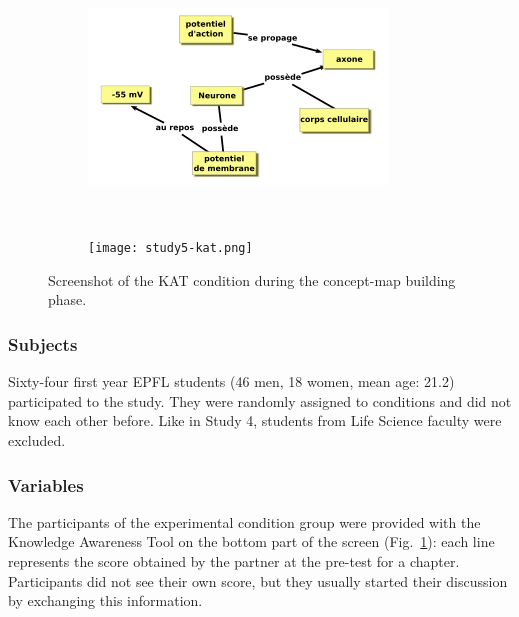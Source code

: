\documentclass[natbib]{svjour3}
\begin{document}
\begin{figure}[h!t]
        \centering
        \begin{subfigure}{.6\textwidth}
            \includegraphics[width=\linewidth]{study5-conceptmap.png}
        \end{subfigure} \\
        \begin{subfigure}{.7\textwidth}
            \texttt{[image: study5-kat.png]}
        \end{subfigure}
        \caption{Screenshot of the KAT condition during the concept-map building
        phase.}
        \label{study5:kat}
\end{figure}

\subsubsection*{Subjects}

Sixty-four first year EPFL students (46 men, 18 women, mean age: 21.2)
participated to the study. They were randomly assigned to conditions and
did not know each other before. Like in Study 4, students from Life Science
faculty were excluded.

\subsubsection*{Variables}

The participants of the experimental condition group were provided with the
Knowledge Awareness Tool on the bottom part of the screen
(Fig.~\ref{study5:kat}): each line represents the score obtained by the partner
at the pre-test for a chapter. Participants did not see their own score, but they
usually started their discussion by exchanging this information.
\end{document}
